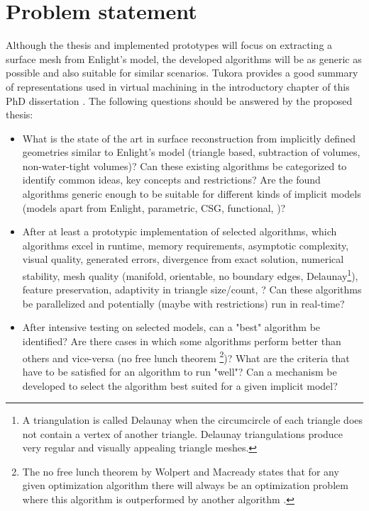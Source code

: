 
\section{Problem statement}

Although the thesis and implemented prototypes will focus on extracting a surface mesh from Enlight's model, the developed algorithms will be as generic as possible and also suitable for similar scenarios. Tukora provides a good summary of representations used in virtual machining in the introductory chapter of this PhD dissertation \cite{virtual_machining_review}.
The following questions should be answered by the proposed thesis:

\begin{itemize}
	\item What is the state of the art in surface reconstruction from implicitly defined geometries similar to Enlight's model (triangle based, subtraction of volumes, non-water-tight volumes)? Can these existing algorithms be categorized to identify common ideas, key concepts and restrictions? Are the found algorithms generic enough to be suitable for different kinds of implicit models (models apart from Enlight, parametric, CSG, functional, \etc)?
	
	\item After at least a prototypic implementation of selected algorithms, which algorithms excel in runtime, memory requirements, asymptotic complexity, visual quality, generated errors, divergence from exact solution, numerical stability, mesh quality (manifold, orientable, no boundary edges, Delaunay\footnote{A triangulation is called Delaunay when the circumcircle of each triangle does not contain a vertex of another triangle. Delaunay triangulations produce very regular and visually appealing triangle meshes.}), feature preservation, adaptivity in triangle size/count, \etc? Can these algorithms be parallelized and potentially (maybe with restrictions) run in real-time?
	
	\item After intensive testing on selected models, can a "best" algorithm be identified? Are there cases in which some algorithms perform better than others and vice-versa (\cf no free lunch theorem \footnote{The no free lunch theorem by Wolpert and Macready states that for any given optimization algorithm there will always be an optimization problem where this algorithm is outperformed by another algorithm \cite{no_free_lunch}. })? What are the criteria that have to be satisfied for an algorithm to run "well"? Can a mechanism be developed to select the algorithm best suited for a given implicit model?
\end{itemize}
